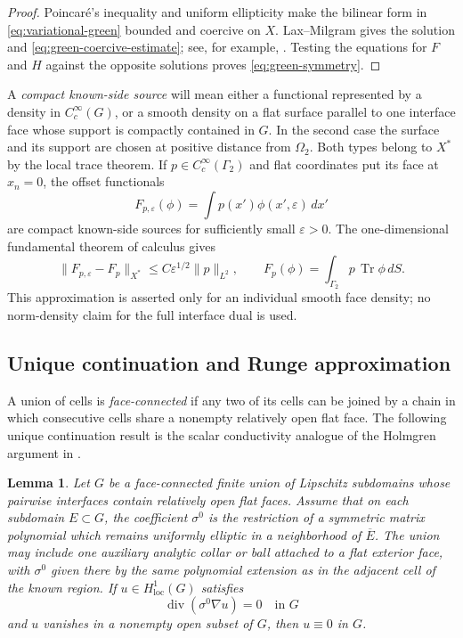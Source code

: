 \documentclass[11pt,oneside]{article}
\newtheorem{lemma}[theorem]{Lemma}
\newcommand{\diver}{\operatorname{div}}
\begin{document}
\begin{proof}
Poincar\'e's inequality and uniform ellipticity make the bilinear form in
\eqref{eq:variational-green} bounded and coercive on \(X\).  Lax--Milgram gives
the solution and \eqref{eq:green-coercive-estimate}; see, for example,
\cite[Chapter 6]{Evans2010}.  Testing the equations for \(F\) and \(H\) against
the opposite solutions proves \eqref{eq:green-symmetry}.
\end{proof}

A \emph{compact known-side source} will mean either a functional represented
by a density in \(C_c^\infty(G)\), or a smooth density on a flat surface
parallel to one interface face whose support is compactly contained in \(G\).
In the second case the surface and its support are chosen at positive distance
from \(\Omega_2\).  Both types belong to \(X^*\) by the local trace theorem.  If
\(p\in C_c^\infty(\Gamma_2)\) and flat coordinates put its face at \(x_n=0\),
the offset functionals
\begin{equation}
  F_{p,\varepsilon}(\phi)
  =\int p(x')\phi(x',\varepsilon)\,dx'
  \label{eq:offset-source}
\end{equation}
are compact known-side sources for sufficiently small \(\varepsilon>0\).  The
one-dimensional fundamental theorem of calculus gives
\begin{equation}
  \|F_{p,\varepsilon}-F_p\|_{X^*}
  \le C\varepsilon^{1/2}\|p\|_{L^2},
  \qquad
  F_p(\phi)=\int_{\Gamma_2}p\,\operatorname{Tr}\phi\,dS .
  \label{eq:offset-source-limit}
\end{equation}
This approximation is asserted only for an individual smooth face density; no
norm-density claim for the full interface dual is used.

\subsection{Unique continuation and Runge approximation}

A union of cells is \emph{face-connected} if any two of its cells can be joined
by a chain in which consecutive cells share a nonempty relatively open flat
face.  The following unique continuation result is the scalar conductivity
analogue of the Holmgren argument in \cite{CarsteaHondaNakamura2018}.

\begin{lemma}
\label{lem:piecewise-poly-ucp}
Let \(G\) be a face-connected finite union of Lipschitz subdomains whose
pairwise interfaces contain relatively open flat faces.  Assume that on each
subdomain \(E\subset G\), the coefficient \(\sigma^0\) is the restriction of a
symmetric matrix polynomial which remains uniformly elliptic in a neighborhood
of \(\overline E\).  The union may include one auxiliary analytic collar or
ball attached to a flat exterior face, with \(\sigma^0\) given there by the same
polynomial extension as in the adjacent cell of the known region.  If
\(u\in H^1_{\mathrm{loc}}(G)\) satisfies
\begin{equation}
  \diver(\sigma^0\nabla u)=0\quad\text{in }G
\end{equation}
and \(u\) vanishes in a nonempty open subset of \(G\), then \(u\equiv0\) in
\(G\).
\end{lemma}
\end{document}
